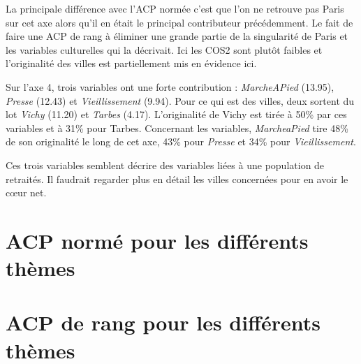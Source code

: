 \documentclass{article}
\begin{document}
La principale différence avec l'ACP normée c'est que l'on ne retrouve pas Paris sur cet axe alors qu'il en était le principal contributeur précédemment. Le fait de faire une ACP de rang à éliminer une grande partie de la singularité de Paris et les variables culturelles qui la décrivait. Ici les COS2 sont plutôt faibles et l'originalité des villes est partiellement mis en évidence ici.

\bigskip

Sur l'axe 4, trois variables ont une forte contribution : \emph{MarcheAPied} (13.95), \emph{Presse} (12.43) et \emph{Vieillissement} (9.94). Pour ce qui est des villes, deux sortent du lot \emph{Vichy} (11.20) et \emph{Tarbes} (4.17). L'originalité de Vichy est tirée à 50\% par ces variables et à 31\% pour Tarbes. Concernant les variables, \emph{MarcheaPied} tire 48\% de son originalité le long de cet axe, 43\% pour \emph{Presse} et 34\% pour \emph{Vieillissement}. 

\bigskip

Ces trois variables semblent décrire des variables liées à une population de retraités. Il faudrait regarder plus en détail les villes concernées pour en avoir le c\oe ur net.  

 

   








\section{ACP normé pour les différents thèmes}

\section{ACP de rang pour les différents thèmes}





 
\end{document}
